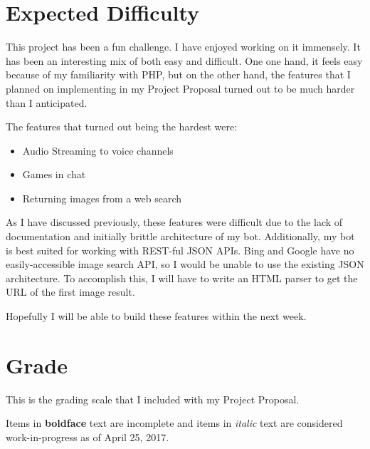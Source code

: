 \documentclass[12pt]{article} %
\begin{document}
\section*{Expected Difficulty}

This project has been a fun challenge. I have enjoyed working on it immensely. It has been an interesting mix of both easy and difficult. One one hand, it feels easy because of my familiarity with PHP, but on the other hand, the features that I planned on implementing in my Project Proposal turned out to be much harder than I anticipated.

The features that turned out being the hardest were:

\begin{itemize}
    \item Audio Streaming to voice channels
    \item Games in chat
    \item Returning images from a web search
\end{itemize}

As I have discussed previously, these features were difficult due to the lack of documentation and initially brittle architecture of my bot. Additionally, my bot is best suited for working with REST-ful JSON APIs. Bing and Google have no easily-accessible image search API, so I would be unable to use the existing JSON architecture. To accomplish this, I will have to write an HTML parser to get the URL of the first image result.

Hopefully I will be able to build these features within the next week.


\section*{Grade}

This is the grading scale that I included with my Project Proposal.

Items in \textbf{boldface} text are incomplete and items in \textit{italic} text are considered work-in-progress as of April 25, 2017.
\end{document}
